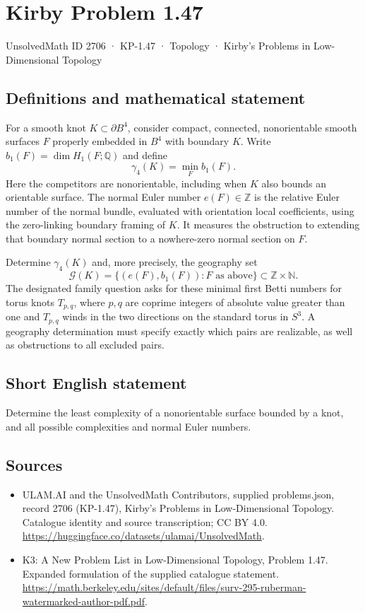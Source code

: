 \documentclass[11pt,a4paper]{article}
\begin{document}
\section*{Kirby Problem 1.47}\label{2706}
{\small UnsolvedMath ID 2706 · KP-1.47 · Topology · Kirby's Problems in Low-Dimensional Topology}
\subsection{Definitions and mathematical statement}
For a smooth knot $K\subset\partial B^4$, consider compact, connected,
nonorientable smooth surfaces $F$ properly embedded in $B^4$ with boundary $K$.
Write $b_1(F)=\dim H_1(F;\mathbb Q)$ and define
\[
\gamma_4(K)=\min_F b_1(F).
\]
Here the competitors are nonorientable, including when $K$ also bounds an
orientable surface. The normal Euler number $e(F)\in\mathbb Z$ is the relative
Euler number of the normal bundle, evaluated with orientation local coefficients,
using the zero-linking boundary framing of $K$. It measures the obstruction to
extending that boundary normal section to a nowhere-zero normal section on $F$.

Determine $\gamma_4(K)$ and, more precisely, the geography set
\[
\mathcal G(K)=\{(e(F),b_1(F)):F\text{ as above}\}\subset\mathbb Z\times\mathbb N.
\]
The designated family question asks for these minimal first Betti numbers for
torus knots $T_{p,q}$, where $p,q$ are coprime integers of absolute value greater
than one and $T_{p,q}$ winds in the two directions on the standard torus in
$S^3$. A geography determination must specify exactly which pairs are realizable,
as well as obstructions to all excluded pairs.
\subsection{Short English statement}
Determine the least complexity of a nonorientable surface bounded by a knot, and all possible complexities and normal Euler numbers.
\subsection{Sources}
\begin{itemize}
\item[S1] ULAM.AI and the UnsolvedMath Contributors, supplied problems.json, record 2706 (KP-1.47), Kirby's Problems in Low-Dimensional Topology. Catalogue identity and source transcription; CC BY 4.0.
\url{https://huggingface.co/datasets/ulamai/UnsolvedMath}.
\item[S2] K3: A New Problem List in Low-Dimensional Topology, Problem 1.47. Expanded formulation of the supplied catalogue statement.
\url{https://math.berkeley.edu/sites/default/files/surv-295-ruberman-watermarked-author-pdf.pdf}.
\end{itemize}
\end{document}
